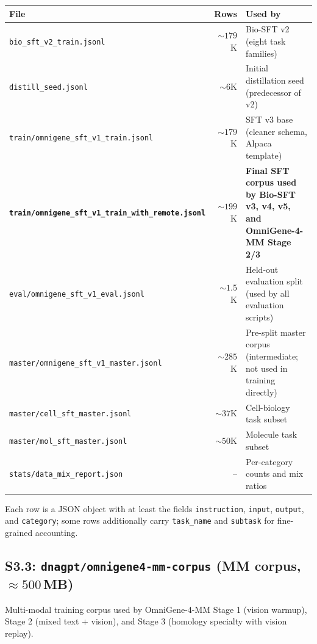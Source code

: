 \documentclass[11pt]{article}
\begin{document}
\begin{table}[H]
\centering
\small
\begin{tabular}{lrl}
\toprule
\textbf{File} & \textbf{Rows} & \textbf{Used by} \\
\midrule
\texttt{bio\_sft\_v2\_train.jsonl}                    & $\sim 179$K & Bio-SFT v2 (eight task families) \\
\texttt{distill\_seed.jsonl}                          & $\sim 6$K   & Initial distillation seed (predecessor of v2) \\
\texttt{train/omnigene\_sft\_v1\_train.jsonl}         & $\sim 179$K & SFT v3 base (cleaner schema, Alpaca template) \\
\textbf{\texttt{train/omnigene\_sft\_v1\_train\_with\_remote.jsonl}} & $\sim 199$K & \textbf{Final SFT corpus used by Bio-SFT v3, v4, v5, and OmniGene-4-MM Stage 2/3} \\
\texttt{eval/omnigene\_sft\_v1\_eval.jsonl}           & $\sim 1.5$K & Held-out evaluation split (used by all evaluation scripts) \\
\texttt{master/omnigene\_sft\_v1\_master.jsonl}       & $\sim 285$K & Pre-split master corpus (intermediate; not used in training directly) \\
\texttt{master/cell\_sft\_master.jsonl}               & $\sim 37$K  & Cell-biology task subset \\
\texttt{master/mol\_sft\_master.jsonl}                & $\sim 50$K  & Molecule task subset \\
\texttt{stats/data\_mix\_report.json}                 & --          & Per-category counts and mix ratios \\
\bottomrule
\end{tabular}
\end{table}

Each row is a JSON object with at least the fields \texttt{instruction},
\texttt{input}, \texttt{output}, and \texttt{category}; some rows additionally
carry \texttt{task\_name} and \texttt{subtask} for fine-grained accounting.

\subsection*{S3.3: \texttt{dnagpt/omnigene4-mm-corpus} (MM corpus, $\approx 500$\,MB)}

Multi-modal training corpus used by OmniGene-4-MM Stage 1 (vision warmup),
Stage 2 (mixed text + vision), and Stage 3 (homology specialty with vision
replay).
\end{document}
